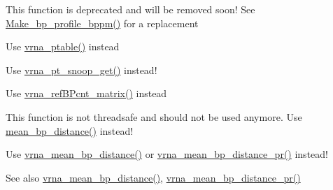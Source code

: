 \begin{DoxyRefList}
\item[\label{deprecated__deprecated000122}%
\hypertarget{deprecated__deprecated000122}{}%
global\+Scope$>$ Global \hyperlink{profiledist_8h_a904c7eaf4a2413567c00ac4891749d18}{Make\+\_\+bp\+\_\+profile} (int length)]This function is deprecated and will be removed soon! See \hyperlink{profiledist_8h_a3dff26e707a2a2e65a0f759caabde6e7}{Make\+\_\+bp\+\_\+profile\+\_\+bppm()} for a replacement 
\item[\label{deprecated__deprecated000132}%
\hypertarget{deprecated__deprecated000132}{}%
global\+Scope$>$ Global \hyperlink{group__struct__utils_ga89c32307ee50a0026f4a3131fac0845a}{make\+\_\+pair\+\_\+table} (const char $\ast$structure)]Use \hyperlink{group__struct__utils_gae829fb8bb7f694c12a9c0bbc34c77c60}{vrna\+\_\+ptable()} instead 
\item[\label{deprecated__deprecated000135}%
\hypertarget{deprecated__deprecated000135}{}%
global\+Scope$>$ Global \hyperlink{group__struct__utils_ga9aa3bf3b4346bb7fb88efc154dd07a79}{make\+\_\+pair\+\_\+table\+\_\+snoop} (const char $\ast$structure)]Use \hyperlink{group__struct__utils_gaef0f7e1a6c00c81a349973de53039dda}{vrna\+\_\+pt\+\_\+snoop\+\_\+get()} instead!  
\item[\label{deprecated__deprecated000137}%
\hypertarget{deprecated__deprecated000137}{}%
global\+Scope$>$ Global \hyperlink{group__struct__utils_ga578cd9712dee812fb1c58aa3cc489864}{make\+\_\+reference\+B\+P\+\_\+array} (short $\ast$reference\+\_\+pt, unsigned int turn)]Use \hyperlink{group__struct__utils_gab4c2a00c99ce1d612ffa5bde114eb96d}{vrna\+\_\+ref\+B\+Pcnt\+\_\+matrix()} instead  
\item[\label{deprecated__deprecated000106}%
\hypertarget{deprecated__deprecated000106}{}%
global\+Scope$>$ Global \hyperlink{part__func_8h_ae9556ba7ded44fe2321b6f67c3fc02a3}{mean\+\_\+bp\+\_\+dist} (int length)]This function is not threadsafe and should not be used anymore. Use \hyperlink{group__pf__fold_ga79cbc375af65f11609feb6b055269e7d}{mean\+\_\+bp\+\_\+distance()} instead!  
\item[\label{deprecated__deprecated000100}%
\hypertarget{deprecated__deprecated000100}{}%
global\+Scope$>$ Global \hyperlink{group__pf__fold_ga79cbc375af65f11609feb6b055269e7d}{mean\+\_\+bp\+\_\+distance} (int length)]Use \hyperlink{group__pf__fold_gaa6b8983b559b9ef4b2e1b31113ea317b}{vrna\+\_\+mean\+\_\+bp\+\_\+distance()} or \hyperlink{group__pf__fold_gad3f0c240512e6d43e2e4d4c2076021f5}{vrna\+\_\+mean\+\_\+bp\+\_\+distance\+\_\+pr()} instead! \begin{DoxySeeAlso}{See also}
\hyperlink{group__pf__fold_gaa6b8983b559b9ef4b2e1b31113ea317b}{vrna\+\_\+mean\+\_\+bp\+\_\+distance()}, \hyperlink{group__pf__fold_gad3f0c240512e6d43e2e4d4c2076021f5}{vrna\+\_\+mean\+\_\+bp\+\_\+distance\+\_\+pr()} 
\end{DoxySeeAlso}


\end{DoxyRefList}
